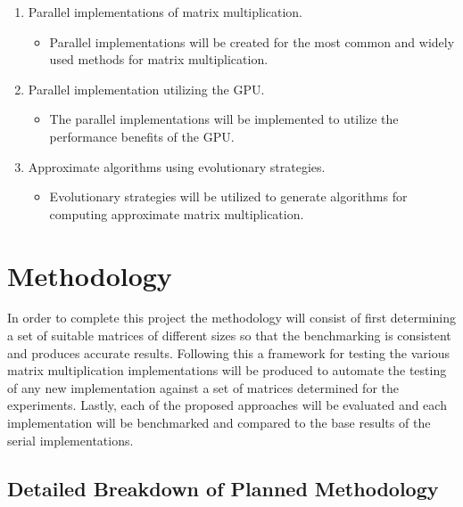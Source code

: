 \documentclass{article}
\begin{document}
\begin{enumerate}
\item Parallel implementations of matrix multiplication.
    \begin{itemize}
    \item Parallel implementations will be created for the most common and widely used methods for matrix multiplication.
    \end{itemize}
    
\item Parallel implementation utilizing the GPU.
    \begin{itemize}
    \item The parallel implementations will be implemented to utilize the performance benefits of the GPU.
    \end{itemize}

\item Approximate algorithms using evolutionary strategies.
    \begin{itemize}
    \item Evolutionary strategies will be utilized to generate algorithms for computing approximate matrix multiplication.
    \end{itemize}
\end{enumerate}




\section{Methodology}

In order to complete this project the methodology will consist of first determining a set of suitable matrices of different sizes so that the benchmarking is consistent and produces accurate results. Following this a framework for testing the various matrix multiplication implementations will be produced to automate the testing of any new implementation against a set of matrices determined for the experiments. Lastly, each of the proposed approaches will be evaluated and each implementation will be benchmarked and compared to the base results of the serial implementations.\\


\subsection{Detailed Breakdown of Planned Methodology}
\end{document}
